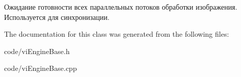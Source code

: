 Ожидание готовности всех параллельных потоков обработки изображения. Используется для синхронизации. 



The documentation for this class was generated from the following files\+:\begin{DoxyCompactItemize}
\item 
code/vi\+Engine\+Base.\+h\item 
code/vi\+Engine\+Base.\+cpp\end{DoxyCompactItemize}
